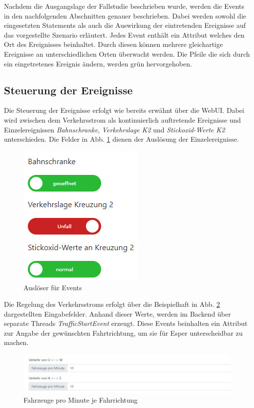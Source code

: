 Nachdem die Ausgangslage der Fallstudie beschrieben wurde, werden die Events in den nachfolgenden Abschnitten genauer beschrieben. Dabei werden sowohl die eingesetzten Statements als auch die Auswirkung der eintretenden Ereignisse auf das vorgestellte Szenario erläutert. Jedes Event enthält ein Attribut welches den Ort des Ereignisses beinhaltet. Durch diesen können mehrere gleichartige Ereignisse an unterschiedlichen Orten überwacht werden. Die Pfeile die sich durch ein eingetretenes Ereignis ändern, werden grün hervorgehoben.

\subsection{Steuerung der Ereignisse}
Die Steuerung der Ereignisse erfolgt wie bereits erwähnt über die WebUI. Dabei wird zwischen dem Verkehrsstrom als kontinuierlich auftretende Ereignisse und Einzelereignissen \textit{Bahnschranke}, \textit{Verkehrslage K2} und \textit{Stickoxid-Werte K2} unterschieden. Die Felder in Abb. \ref{fig5} dienen der Auslösung der Einzelereignisse.

\begin{figure}[ht]
\begin{center}
	\includegraphics[scale=0.7]{images/EventTrigger.png}
	\caption{Auslöser für Events}
	\label{fig5}
\end{center}
\end{figure}

Die Regelung des Verkehrsstroms erfolgt über die Beispielhaft in Abb. \ref{fig12} dargestellten Eingabefelder. Anhand dieser Werte, werden im Backend über separate Threads \textit{TrafficStartEvent} erzeugt. Diese Events beinhalten ein Attribut zur Angabe der gewünschten Fahrtrichtung, um sie für Esper unterscheidbar zu machen.

\begin{figure}[ht]
\begin{center}
	\includegraphics[width=\textwidth]{images/verkehrsstrom.png}
	\caption{Fahrzeuge pro Minute je Fahrrichtung}
	\label{fig12}
\end{center}
\end{figure}

